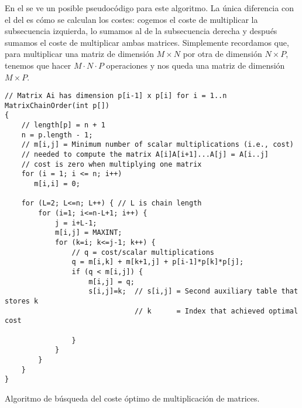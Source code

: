 \documentclass[palatino, nochap]{apuntes}
\begin{document}
En el  se ve un posible pseudocódigo para este algoritmo. La única diferencia con el del  es cómo se calculan los costes: cogemos el coste de multiplicar la subsecuencia izquierda, lo sumamos al de la subsecuencia derecha y después sumamos el coste de multiplicar ambas matrices. Simplemente recordamos que, para multiplicar una matriz de dimensión $M×N$ por otra de dimensión $N × P$, tenemos que hacer $M·N·P$ operaciones y nos queda una matriz de dimensión $M × P$.

\begin{listing}[hbtp]
\begin{verbatim}
// Matrix Ai has dimension p[i-1] x p[i] for i = 1..n
MatrixChainOrder(int p[])
{
    // length[p] = n + 1
    n = p.length - 1;
    // m[i,j] = Minimum number of scalar multiplications (i.e., cost)
    // needed to compute the matrix A[i]A[i+1]...A[j] = A[i..j]
    // cost is zero when multiplying one matrix
    for (i = 1; i <= n; i++)
       m[i,i] = 0;

    for (L=2; L<=n; L++) { // L is chain length
        for (i=1; i<=n-L+1; i++) {
            j = i+L-1;
            m[i,j] = MAXINT;
            for (k=i; k<=j-1; k++) {
                // q = cost/scalar multiplications
                q = m[i,k] + m[k+1,j] + p[i-1]*p[k]*p[j];
                if (q < m[i,j]) {
                    m[i,j] = q;
                    s[i,j]=k;  // s[i,j] = Second auxiliary table that stores k
                               // k      = Index that achieved optimal cost

                }
            }
        }
    }
}

\end{verbatim}
\caption{Algoritmo de búsqueda del coste óptimo de multiplicación de matrices.}
\label{lst:MatrixMult}
\end{listing}


\printindex
\end{document}
